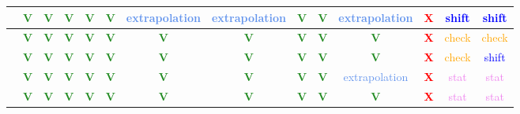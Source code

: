 \begin{frame}
{\begin{tabular}{|c||*{13}{c|}}
\hline
[283-344] & \textcolor{ForestGreen}{\textbf{V}} & \textcolor{ForestGreen}{\textbf{V}} & \textcolor{ForestGreen}{\textbf{V}} & \textcolor{ForestGreen}{\textbf{V}} & \textcolor{ForestGreen}{\textbf{V}} & \textcolor{CornflowerBlue}{extrapolation} & \textcolor{CornflowerBlue}{extrapolation} & \textcolor{ForestGreen}{\textbf{V}} & \textcolor{ForestGreen}{\textbf{V}} & \textcolor{CornflowerBlue}{extrapolation} & \textcolor{Red}{\textbf{X}} & \textcolor{blue}{shift} & \textcolor{blue}{shift} \\
\hline
[344-443] & \textcolor{ForestGreen}{\textbf{V}} & \textcolor{ForestGreen}{\textbf{V}} & \textcolor{ForestGreen}{\textbf{V}} & \textcolor{ForestGreen}{\textbf{V}} & \textcolor{ForestGreen}{\textbf{V}} & \textcolor{ForestGreen}{\textbf{V}} & \textcolor{ForestGreen}{\textbf{V}} & \textcolor{ForestGreen}{\textbf{V}} & \textcolor{ForestGreen}{\textbf{V}} & \textcolor{ForestGreen}{\textbf{V}} & \textcolor{Red}{\textbf{X}} & \textcolor{orange}{check} & \textcolor{orange}{check} \\
\hline
[443-577] & \textcolor{ForestGreen}{\textbf{V}} & \textcolor{ForestGreen}{\textbf{V}} & \textcolor{ForestGreen}{\textbf{V}} & \textcolor{ForestGreen}{\textbf{V}} & \textcolor{ForestGreen}{\textbf{V}} & \textcolor{ForestGreen}{\textbf{V}} & \textcolor{ForestGreen}{\textbf{V}} & \textcolor{ForestGreen}{\textbf{V}} & \textcolor{ForestGreen}{\textbf{V}} & \textcolor{ForestGreen}{\textbf{V}} & \textcolor{Red}{\textbf{X}} & \textcolor{orange}{check} & \textcolor{blue}{shift} \\
\hline
[577-606] & \textcolor{ForestGreen}{\textbf{V}} & \textcolor{ForestGreen}{\textbf{V}} & \textcolor{ForestGreen}{\textbf{V}} & \textcolor{ForestGreen}{\textbf{V}} & \textcolor{ForestGreen}{\textbf{V}} & \textcolor{ForestGreen}{\textbf{V}} & \textcolor{ForestGreen}{\textbf{V}} & \textcolor{ForestGreen}{\textbf{V}} & \textcolor{ForestGreen}{\textbf{V}} & \textcolor{CornflowerBlue}{extrapolation} & \textcolor{Red}{\textbf{X}} & \textcolor{violet}{stat} & \textcolor{violet}{stat} \\
\hline
[606-1500] & \textcolor{ForestGreen}{\textbf{V}} & \textcolor{ForestGreen}{\textbf{V}} & \textcolor{ForestGreen}{\textbf{V}} & \textcolor{ForestGreen}{\textbf{V}} & \textcolor{ForestGreen}{\textbf{V}} & \textcolor{ForestGreen}{\textbf{V}} & \textcolor{ForestGreen}{\textbf{V}} & \textcolor{ForestGreen}{\textbf{V}} & \textcolor{ForestGreen}{\textbf{V}} & \textcolor{ForestGreen}{\textbf{V}} & \textcolor{Red}{\textbf{X}} & \textcolor{violet}{stat} & \textcolor{violet}{stat} \\
\hline
\end{tabular}
}
\end{frame}
